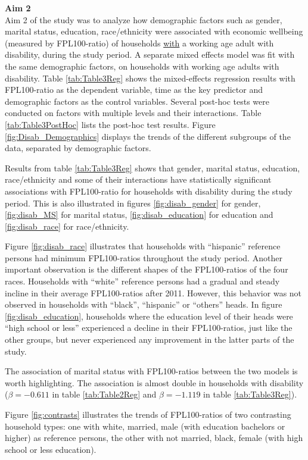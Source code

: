\documentclass[11pt]{extarticle} %
\begin{document}
\noindent
{\bf{Aim 2}}\\
Aim 2 of the study was to analyze how demographic factors such as gender, marital status, education, race/ethnicity were associated with economic wellbeing (measured by FPL100-ratio) of households {\underline{with}} a working age adult with disability, during the study period. A separate mixed effects model was fit with the same demographic factors, on households with working age adults with disability. Table \ref{tab:Table3Reg} shows the mixed-effects regression results with FPL100-ratio as the dependent variable, time as the key predictor and demographic factors as the control variables. Several post-hoc tests were conducted on factors with multiple levels and their interactions. Table \ref{tab:Table3PostHoc} lists the post-hoc test results. Figure \ref{fig:Disab_Demographics} displays the trends of the different subgroups of the data, separated by demographic factors. 

Results from table \ref{tab:Table3Reg} shows that gender, marital status, education, race/ethnicity and some of their interactions have statistically significant associations with FPL100-ratio for households with disability during the study period. This is also illustrated in figures \ref{fig:disab_gender} for gender, \ref{fig:disab_MS} for marital status, \ref{fig:disab_education} for education and \ref{fig:disab_race} for race/ethnicity. 

Figure \ref{fig:disab_race} illustrates that households with ``hispanic'' reference persons had minimum FPL100-ratios throughout the study period. Another important observation is the different shapes of the FPL100-ratios of the four races. Households with ``white'' reference persons had a gradual and steady incline in their average FPL100-ratios after 2011. However, this behavior was not observed in households with ``black'', ``hispanic'' or ``others'' heads. In figure \ref{fig:disab_education}, households where the education level of their heads were ``high school or less'' experienced a decline in their FPL100-ratios, just like the other groups, but never experienced any improvement in the latter parts of the study. 

The association of marital status with FPL100-ratios between the two models is worth highlighting. The association is almost double in households with disability ($\beta = -0.611$ in table \ref{tab:Table2Reg} and $\beta=-1.119$ in table \ref{tab:Table3Reg}). 

Figure \ref{fig:contrasts} illustrates the trends of FPL100-ratios of two contrasting household types: one with white, married, male (with education bachelors or higher) as reference persons, the other with not married, black, female (with high school or less education). 
\end{document}
